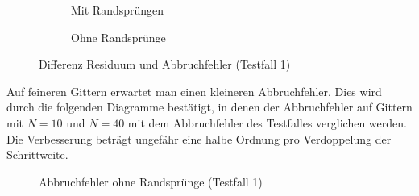 \begin{figure}[ht]
\centering
   \begin{subfigure}{0.49\linewidth} \centering
  \caption{Mit Randsprüngen}
   \end{subfigure}
   \begin{subfigure}{0.49\linewidth} \centering
  \caption{Ohne Randsprünge}
   \end{subfigure}
   \caption{Differenz Residuum und Abbruchfehler (Testfall 1)}
\end{figure}
\noindent
Auf feineren Gittern erwartet man einen kleineren Abbruchfehler. Dies
wird durch die folgenden Diagramme bestätigt, in denen der Abbruchfehler auf
Gittern mit $N=10$ und $N=40$ mit dem Abbruchfehler des Testfalles verglichen werden.
Die Verbesserung beträgt ungefähr eine halbe Ordnung pro Verdoppelung der Schrittweite.
\begin{figure}[ht]
\centering
{}
\caption{Abbruchfehler ohne Randsprünge (Testfall 1)}
\end{figure}

